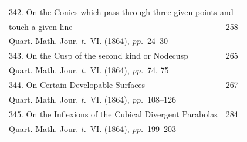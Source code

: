 \documentclass[11pt,a4paper]{article}
\newcommand{\tome}{\textit{t.}}
\newcommand{\pages}{\textit{pp.}}
\begin{document}
\begin{longtable}{p{4.5in}r}
\multicolumn{2}{l}{342. On the Conics which pass through three given points and} \\[-0.3em]
\quad touch a given line & 258 \\[-0.3em]
\multicolumn{2}{l}{\quad\small Quart. Math. Jour. \tome~VI. (1864), \pages~24--30} \\[0.5em]

343. On the Cusp of the second kind or Nodecusp & 265 \\[-0.3em]
\multicolumn{2}{l}{\quad\small Quart. Math. Jour. \tome~VI. (1864), \pages~74, 75} \\[0.5em]

344. On Certain Developable Surfaces & 267 \\[-0.3em]
\multicolumn{2}{l}{\quad\small Quart. Math. Jour. \tome~VI. (1864), \pages~108--126} \\[0.5em]

345. On the Inflexions of the Cubical Divergent Parabolas & 284 \\[-0.3em]
\multicolumn{2}{l}{\quad\small Quart. Math. Jour. \tome~VI. (1864), \pages~199--203} \\[0.5em]
\end{longtable}

\clearpage
\end{document}
